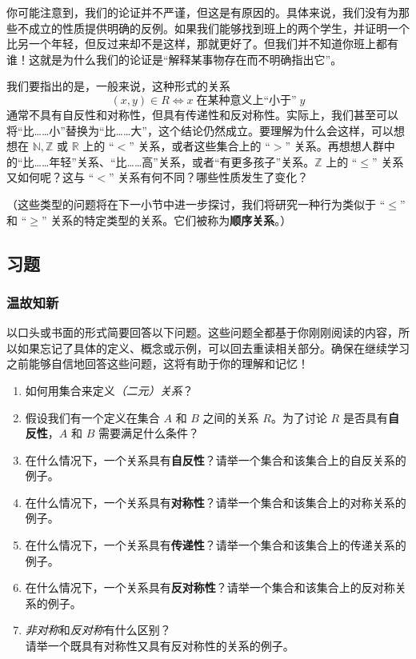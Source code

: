 你可能注意到，我们的论证并不严谨，但这是有原因的。具体来说，我们没有为那些不成立的性质提供明确的反例。如果我们能够找到班上的两个学生，并证明一个比另一个年轻，但反过来却不是这样，那就更好了。但我们并不知道你班上都有谁！这就是为什么我们的论证是``解释某事物存在而不明确指出它''。

我们要指出的是，一般来说，这种形式的关系
\[(x, y) \in R \iff x \;\text{在某种意义上``小于''}\; y\]
通常不具有自反性和对称性，但具有传递性和反对称性。实际上，我们甚至可以将``比……小''替换为``比……大''，这个结论仍然成立。要理解为什么会这样，可以想想在 $\mathbb{N}, \mathbb{Z}$ 或 $\mathbb{R}$ 上的 ``$<$'' 关系，或者这些集合上的 ``$>$'' 关系。再想想人群中的``比……年轻''关系、``比……高''关系，或者``有更多孩子''关系。$\mathbb{Z}$ 上的 ``$\le$'' 关系又如何呢？这与 ``$<$'' 关系有何不同？哪些性质发生了变化？

（这些类型的问题将在下一小节中进一步探讨，我们将研究一种行为类似于 ``$\le$'' 和 ``$\ge$'' 关系的特定类型的关系。它们被称为\textbf{顺序关系}。）

\subsection{习题}

\subsubsection*{温故知新}

以口头或书面的形式简要回答以下问题。这些问题全都基于你刚刚阅读的内容，所以如果忘记了具体的定义、概念或示例，可以回去重读相关部分。确保在继续学习之前能够自信地回答这些问题，这将有助于你的理解和记忆！

\begin{enumerate}[label=(\arabic*)]
    \item 如何用集合来定义\emph{（二元）关系}？
    \item 假设我们有一个定义在集合 $A$ 和 $B$ 之间的关系 $R$。为了讨论 $R$ 是否具有\textbf{自反性}，$A$ 和 $B$ 需要满足什么条件？
    \item 在什么情况下，一个关系具有\textbf{自反性}？请举一个集合和该集合上的自反关系的例子。
    \item 在什么情况下，一个关系具有\textbf{对称性}？请举一个集合和该集合上的对称关系的例子。
    \item 在什么情况下，一个关系具有\textbf{传递性}？请举一个集合和该集合上的传递关系的例子。
    \item 在什么情况下，一个关系具有\textbf{反对称性}？请举一个集合和该集合上的反对称关系的例子。
    \item \emph{非对称}和\emph{反对称}有什么区别？\\
        请举一个既具有对称性又具有反对称性的关系的例子。
\end{enumerate}

